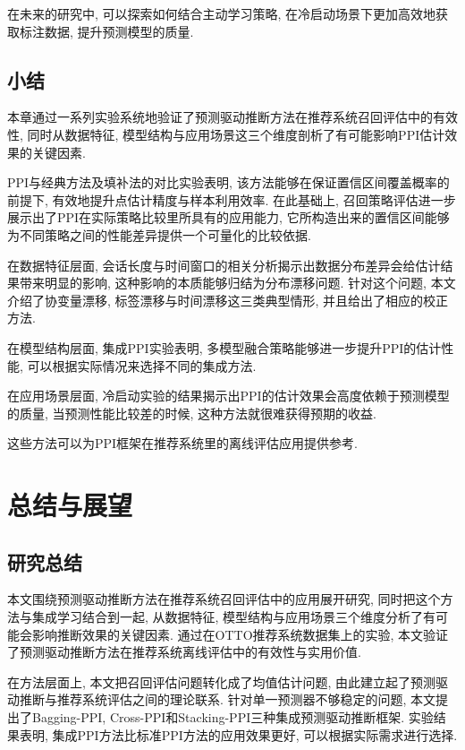 \documentclass[a4paper, AutoFakeBold, UTF8]{ctexrep}
\theoremstyle{plain}
\numberwithin{equation}{chapter}
\begin{document}
在未来的研究中, 可以探索如何结合主动学习策略, 在冷启动场景下更加高效地获取标注数据, 提升预测模型的质量. 




\section{小结}

本章通过一系列实验系统地验证了预测驱动推断方法在推荐系统召回评估中的有效性, 同时从数据特征, 模型结构与应用场景这三个维度剖析了有可能影响PPI估计效果的关键因素. 


PPI与经典方法及填补法的对比实验表明, 该方法能够在保证置信区间覆盖概率的前提下, 有效地提升点估计精度与样本利用效率. 在此基础上, 召回策略评估进一步展示出了PPI在实际策略比较里所具有的应用能力, 它所构造出来的置信区间能够为不同策略之间的性能差异提供一个可量化的比较依据. 

在数据特征层面, 会话长度与时间窗口的相关分析揭示出数据分布差异会给估计结果带来明显的影响, 这种影响的本质能够归结为分布漂移问题. 针对这个问题, 本文介绍了协变量漂移, 标签漂移与时间漂移这三类典型情形, 并且给出了相应的校正方法. 

在模型结构层面, 集成PPI实验表明, 多模型融合策略能够进一步提升PPI的估计性能, 可以根据实际情况来选择不同的集成方法. 

在应用场景层面, 冷启动实验的结果揭示出PPI的估计效果会高度依赖于预测模型的质量, 当预测性能比较差的时候, 这种方法就很难获得预期的收益. 

这些方法可以为PPI框架在推荐系统里的离线评估应用提供参考. 

\chapter{总结与展望}

\section{研究总结}

本文围绕预测驱动推断方法在推荐系统召回评估中的应用展开研究, 同时把这个方法与集成学习结合到一起, 从数据特征, 模型结构与应用场景三个维度分析了有可能会影响推断效果的关键因素. 通过在OTTO推荐系统数据集上的实验, 本文验证了预测驱动推断方法在推荐系统离线评估中的有效性与实用价值. 

在方法层面上, 本文把召回评估问题转化成了均值估计问题, 由此建立起了预测驱动推断与推荐系统评估之间的理论联系. 针对单一预测器不够稳定的问题, 本文提出了Bagging-PPI, Cross-PPI和Stacking-PPI三种集成预测驱动推断框架. 实验结果表明, 集成PPI方法比标准PPI方法的应用效果更好, 可以根据实际需求进行选择. 
\end{document}
